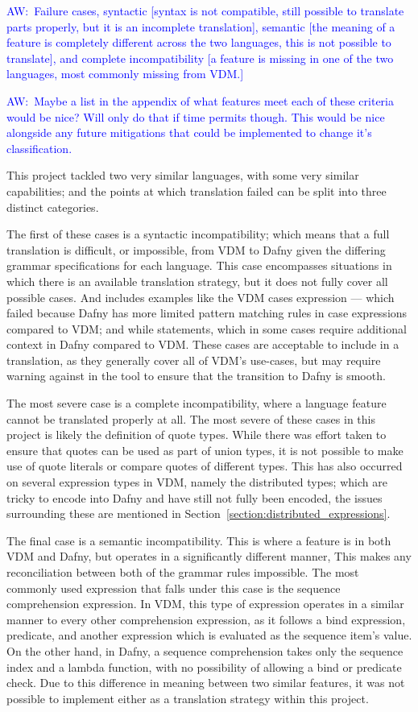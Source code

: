 \documentclass{entcs}
\newcommand{\awcomment}[1]{\ifthenelse { \boolean{showComments} } {\textcolor{blue}{AW:~#1}} { } } %
\begin{document}
\awcomment{Failure cases, syntactic [syntax is not compatible, still possible to translate parts properly, but it is an incomplete translation], semantic [the meaning of a feature is completely different across the two languages, this is not possible to translate], and complete incompatibility [a feature is missing in one of the two languages, most commonly missing from VDM.]}

\awcomment{Maybe a list in the appendix of what features meet each of these criteria would be nice? Will only do that if time permits though. This would be nice alongside any future mitigations that could be implemented to change it's classification.}

This project tackled two very similar languages, with some very similar capabilities; and the points at which translation failed can be split into three distinct categories. 

The first of these cases is a syntactic incompatibility; which means that a full translation is difficult, or impossible, from VDM to Dafny given the differing grammar specifications for each language. This case encompasses situations in which there is an available translation strategy, but it does not fully cover all possible cases. And includes examples like the VDM cases expression --- which failed because Dafny has more limited pattern matching rules in case expressions compared to VDM; and while statements, which in some cases require additional context in Dafny compared to VDM. These cases are acceptable to include in a translation, as they generally cover all of VDM's use-cases, but may require warning against in the tool to ensure that the transition to Dafny is smooth.

The most severe case is a complete incompatibility, where a language feature cannot be translated properly at all. The most severe of these cases in this project is likely the definition of quote types. While there was effort taken to ensure that quotes can be used as part of union types, it is not possible to make use of quote literals or compare quotes of different types. This has also occurred on several expression types in VDM, namely the distributed types; which are tricky to encode into Dafny and have still not fully been encoded, the issues surrounding these are mentioned in Section~\ref{section:distributed_expressions}.

The final case is a semantic incompatibility. This is where a feature is in both VDM and Dafny, but operates in a significantly different manner, This makes any reconciliation between both of the grammar rules impossible. The most commonly used expression that falls under this case is the sequence comprehension expression. In VDM, this type of expression operates in a similar manner to every other comprehension expression, as it follows a bind expression, predicate, and another expression which is evaluated as the sequence item's value. On the other hand, in Dafny, a sequence comprehension takes only the sequence index and a lambda function, with no possibility of allowing a bind or predicate check. Due to this difference in meaning between two similar features, it was not possible to implement either as a translation strategy within this project.
\end{document}
